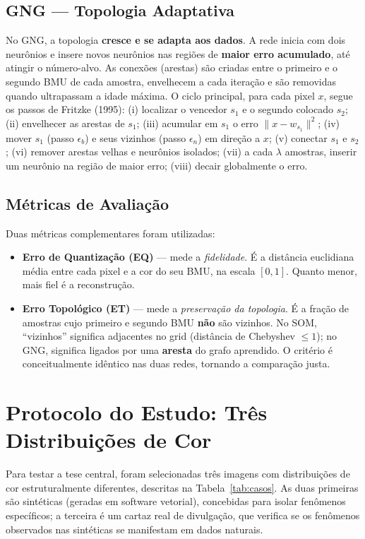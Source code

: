 \documentclass[11pt,a4paper]{article}
\begin{document}
\subsection{GNG --- Topologia Adaptativa}
No GNG, a topologia \textbf{cresce e se adapta aos dados}. A rede inicia com dois neurônios e insere novos neurônios nas regiões de \textbf{maior erro acumulado}, até atingir o número-alvo. As conexões (arestas) são criadas entre o primeiro e o segundo BMU de cada amostra, envelhecem a cada iteração e são removidas quando ultrapassam a idade máxima. O ciclo principal, para cada pixel $x$, segue os passos de Fritzke (1995): (i) localizar o vencedor $s_1$ e o segundo colocado $s_2$; (ii) envelhecer as arestas de $s_1$; (iii) acumular em $s_1$ o erro $\lVert x - w_{s_1}\rVert^2$; (iv) mover $s_1$ (passo $\epsilon_b$) e seus vizinhos (passo $\epsilon_n$) em direção a $x$; (v) conectar $s_1$ e $s_2$; (vi) remover arestas velhas e neurônios isolados; (vii) a cada $\lambda$ amostras, inserir um neurônio na região de maior erro; (viii) decair globalmente o erro.

\subsection{Métricas de Avaliação}
Duas métricas complementares foram utilizadas:
\begin{itemize}
    \item \textbf{Erro de Quantização (EQ)} --- mede a \textit{fidelidade}. É a distância euclidiana média entre cada pixel e a cor do seu BMU, na escala $[0,1]$. Quanto menor, mais fiel é a reconstrução.
    \item \textbf{Erro Topológico (ET)} --- mede a \textit{preservação da topologia}. É a fração de amostras cujo primeiro e segundo BMU \textbf{não} são vizinhos. No SOM, ``vizinhos'' significa adjacentes no grid (distância de Chebyshev $\le 1$); no GNG, significa ligados por uma \textbf{aresta} do grafo aprendido. O critério é conceitualmente idêntico nas duas redes, tornando a comparação justa.
\end{itemize}

\section{Protocolo do Estudo: Três Distribuições de Cor}

Para testar a tese central, foram selecionadas três imagens com distribuições de cor estruturalmente diferentes, descritas na Tabela~\ref{tab:casos}. As duas primeiras são sintéticas (geradas em software vetorial), concebidas para isolar fenômenos específicos; a terceira é um cartaz real de divulgação, que verifica se os fenômenos observados nas sintéticas se manifestam em dados naturais.
\end{document}

